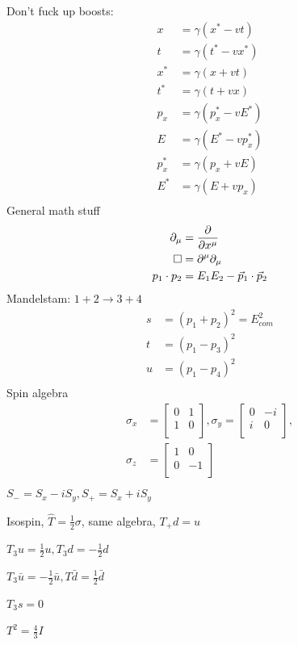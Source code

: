 \begin{multicols}{2}
    Don't fuck up boosts:
    \begin{align*}
        x &= \gamma (x^* - vt) \\
        t &= \gamma (t^* - vx^*) \\
        x^* &= \gamma (x + vt) \\
        t^* &= \gamma (t + vx) \\
        p_x &= \gamma (p_x^* - vE^*) \\
        E &= \gamma (E^* - vp_x^*) \\
        p_x^* &= \gamma (p_x + vE) \\
        E^* &= \gamma (E + vp_x) \\
    \end{align*}
    General math stuff
    \begin{align*}
        \partial_\mu &= \frac{\partial}{\partial x^\mu} \\
        \square &= \partial^\mu \partial_\mu \\
        p_1 \cdot p_2 &= E_1 E_2 - \vec{p}_1 \cdot \vec{p}_2 \\
    \end{align*}
    Mandelstam: $1+2 \to 3+4$
    \begin{align*}
        s &= (p_1 + p_2)^2 = E_{com}^2 \\
        t &= (p_1 - p_3)^2 \\
        u &= (p_1 - p_4)^2 \\
    \end{align*}
    Spin algebra
    \begin{align*}
        \sigma_x &= \begin{bmatrix}
            0 & 1 \\
            1 & 0 \\
        \end{bmatrix}, \sigma_y = \begin{bmatrix}
            0 & -i \\
            i & 0 \\
        \end{bmatrix},\\
        \sigma_z &= \begin{bmatrix}
            1 & 0 \\
            0 & -1 \\
        \end{bmatrix} \\
    \end{align*}
    $S_- = S_x - iS_y, S_+ = S_x + iS_y$

    Isospin, $\hat{T} = \frac{1}{2}\sigma$, same algebra, $T_+d = u$

    $T_3u = \frac{1}{2}u, T_3d = -\frac{1}{2}d$

    $T_3\bar{u} = -\frac{1}{2}\bar{u}, T\bar{d} = \frac{1}{2}\bar{d}$

    $T_3s=0$

    $T^2 = \frac{4}{3}I$

\end{multicols}